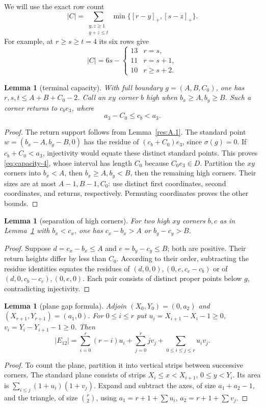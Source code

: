 \documentclass[11pt]{article}
\newtheorem{lemma}[theorem]{Lemma}
\theoremstyle{definition}
\theoremstyle{remark}
\theoremstyle{plain}
\begin{document}
We will use the exact row count
\[
 |C|=\sum_{\substack{y,z\ge1\\y+z\le t}}
 \min\{[r-y]_+,[s-z]_+\}.\tag{3.2}\label{eq:capacity-2}
\]
For example, at $r\ge s\ge t=4$ its six rows give
\[
 |C|=6s-\begin{cases}13&r=s,\\11&r=s+1,\\10&r\ge s+2.\end{cases}\tag{3.3}\label{eq:capacity-3}
\]

\begin{lemma}[terminal capacity]\label{res:A.5}
With full boundary $g=(A,B,C_0)$, one has $r,s,t\le A+B+C_0-2$.
Call an $xy$ corner $b$ \emph{high} when $b_x\ge A,b_y\ge B$.
Such a corner returns to $c_be_3$, where
\[
 a_3-C_0\le c_b<a_3.\tag{3.4}\label{eq:capacity-4}
\]
\end{lemma}
\begin{proof}
The return support follows from Lemma~\ref{res:A.1}. The standard point
$w=(b_x-A,b_y-B,0)$ has the residue of $(c_b+C_0)e_3$, since
$\sigma(g)=0$. If $c_b+C_0<a_3$, injectivity would equate these
distinct standard points. This proves \eqref{eq:capacity-4}, whose interval has length
$C_0$ because $C_0e_3\in D$.
Partition the $xy$ corners into $b_x<A$, then $b_x\ge A,b_y<B$,
then the remaining high corners. Their sizes are at most $A-1,B-1,C_0$:
use distinct first coordinates, second coordinates, and returns,
respectively. Permuting coordinates proves the other bounds.
\end{proof}

\begin{lemma}[separation of high corners]\label{res:A.6}
For two high $xy$ corners $b,c$ as in Lemma~\ref{res:A.5} with $b_x<c_x$,
one has $c_x-b_x>A$ or $b_y-c_y>B$.
\end{lemma}
\begin{proof}
Suppose $d=c_x-b_x\le A$ and $e=b_y-c_y\le B$; both are positive.
Their return heights differ by less than $C_0$. According to their
order, subtracting the residue identities equates the residues of
$(d,0,0),(0,e,c_c-c_b)$ or of $(d,0,c_b-c_c),(0,e,0)$.
Each pair consists of distinct proper points below $g$, contradicting
injectivity. \end{proof}

\begin{lemma}[plane gap formula]\label{res:A.7}
Adjoin $(X_0,Y_0)=(0,a_2)$ and $(X_{r+1},Y_{r+1})=(a_1,0)$.
For $0\le i\le r$ put
$u_i=X_{i+1}-X_i-1\ge0$, $v_i=Y_i-Y_{i+1}-1\ge0$. Then
\[
 |E_{12}|=\sum_{i=0}^r(r-i)u_i+\sum_{j=0}^r jv_j
             +\sum_{0\le i\le j\le r}u_iv_j.\tag{3.5}\label{eq:capacity-5}
\]
\end{lemma}
\begin{proof}
To count the plane, partition it into vertical strips between successive
corners. The standard plane consists of strips $X_i\le x<X_{i+1}$,
$0\le y<Y_i$. Its area is
$\sum_{i\le j}(1+u_i)(1+v_j)$.
Expand and subtract the axes, of size $a_1+a_2-1$, and the triangle,
of size $\binom r2$, using
$a_1=r+1+\sum u_i$, $a_2=r+1+\sum v_j$. \end{proof}
\end{document}
